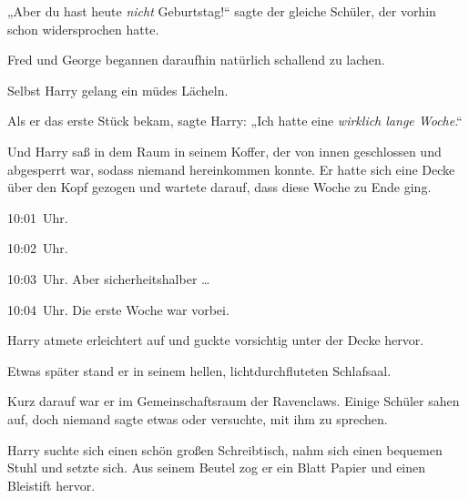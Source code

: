 „Aber du hast heute \emph{nicht} Geburtstag!“ sagte der gleiche Schüler, der vorhin schon widersprochen hatte.

Fred und George begannen daraufhin natürlich schallend zu lachen.

Selbst Harry gelang ein müdes Lächeln.

Als er das erste Stück bekam, sagte Harry:
„Ich hatte eine \emph{wirklich lange Woche}.“

\later

Und Harry saß in dem Raum in seinem Koffer, der von innen geschlossen und abgesperrt war, sodass niemand hereinkommen konnte. Er hatte sich eine Decke über den Kopf gezogen und wartete darauf, dass diese Woche zu Ende ging.

10:01~Uhr.

10:02~Uhr.

10:03~Uhr. Aber sicherheitshalber …

10:04~Uhr. Die erste Woche war vorbei.

Harry atmete erleichtert auf und guckte vorsichtig unter der Decke hervor.

Etwas später stand er in seinem hellen, lichtdurchfluteten Schlafsaal.

Kurz darauf war er im Gemeinschaftsraum der Ravenclaws. Einige Schüler sahen auf, doch niemand sagte etwas oder versuchte, mit ihm zu sprechen.

Harry suchte sich einen schön großen Schreibtisch, nahm sich einen bequemen Stuhl und setzte sich. Aus seinem Beutel zog er ein Blatt Papier und einen Bleistift hervor.

